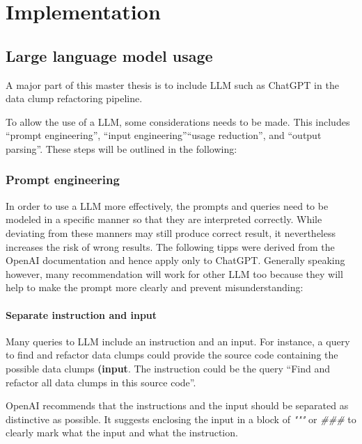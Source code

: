 
\begingroup
\renewcommand{\cleardoublepage}{} %
\renewcommand{\clearpage}{}
\chapter{Implementation}\label{chapter:implementation}
\endgroup

\section{Large language model usage}
A major part of this master thesis is to include \ac{LLM} such as ChatGPT in the data clump refactoring pipeline. 

To allow the use of a \ac{LLM}, some considerations needs to be made. This includes \enquote{prompt engineering}, \enquote{input engineering}\enquote{usage reduction}, and   \enquote{output parsing}. These steps will be outlined in the following:

\subsection{Prompt engineering}\label{sec:prompt_engineering}


In order to use a \ac{LLM} more effectively, the prompts and queries need to be modeled in a specific manner so that they are interpreted correctly. While deviating from these manners may still produce correct result, it nevertheless increases the risk of wrong results. The following tipps were derived from the OpenAI documentation \cite{ChatGPT_url} and hence apply only to ChatGPT. Generally speaking however, many recommendation will work for other \ac{LLM} too because they will help to make the prompt more clearly and prevent misunderstanding:

\subsubsection{Separate instruction and input}
Many queries to \ac{LLM} include an instruction and an input. For instance, a query to find and refactor data clumps could  provide the source code containing the possible data clumps \textbf{(input}. The instruction could be the query \enquote{Find and refactor all data clumps in this source code}. 

OpenAI recommends that the instructions and the input should be separated as distinctive as possible. It suggests enclosing the input in a block of \textit{"""} or \textit{\#\#\#} to clearly mark what the input and what the instruction.

